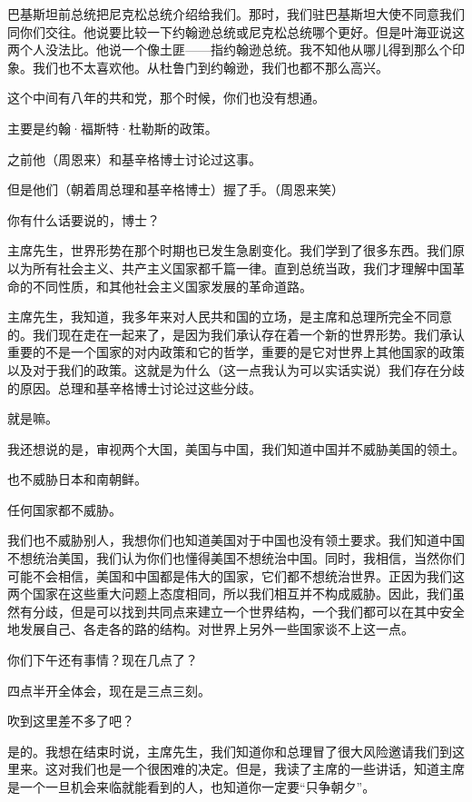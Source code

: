 巴基斯坦前总统把尼克松总统介绍给我们。那时，我们驻巴基斯坦大使不同意我们同你们交往。他说要比较一下约翰逊总统或尼克松总统哪个更好。但是叶海亚说这两个人没法比。他说一个像土匪——指约翰逊总统。我不知他从哪儿得到那么个印象。我们也不太喜欢他。从杜鲁门到约翰逊，我们也都不那么高兴。

这个中间有八年的共和党，那个时候，你们也没有想通。

主要是约翰·福斯特·杜勒斯的政策。

之前他（周恩来）和基辛格博士讨论过这事。

但是他们（朝着周总理和基辛格博士）握了手。（周恩来笑）

你有什么话要说的，博士？

主席先生，世界形势在那个时期也已发生急剧变化。我们学到了很多东西。我们原以为所有社会主义、共产主义国家都千篇一律。直到总统当政，我们才理解中国革命的不同性质，和其他社会主义国家发展的革命道路。

主席先生，我知道，我多年来对人民共和国的立场，是主席和总理所完全不同意的。我们现在走在一起来了，是因为我们承认存在着一个新的世界形势。我们承认重要的不是一个国家的对内政策和它的哲学，重要的是它对世界上其他国家的政策以及对于我们的政策。这就是为什么（这一点我认为可以实话实说）我们存在分歧的原因。总理和基辛格博士讨论过这些分歧。

就是嘛。

我还想说的是，审视两个大国，美国与中国，我们知道中国并不威胁美国的领土。

也不威胁日本和南朝鲜。

任何国家都不威胁。

我们也不威胁别人，我想你们也知道美国对于中国也没有领土要求。我们知道中国不想统治美国，我们认为你们也懂得美国不想统治中国。同时，我相信，当然你们可能不会相信，美国和中国都是伟大的国家，它们都不想统治世界。正因为我们这两个国家在这些重大问题上态度相同，所以我们相互并不构成威胁。因此，我们虽然有分歧，但是可以找到共同点来建立一个世界结构，一个我们都可以在其中安全地发展自己、各走各的路的结构。对世界上另外一些国家谈不上这一点。

你们下午还有事情？现在几点了？

四点半开全体会，现在是三点三刻。

吹到这里差不多了吧？

是的。我想在结束时说，主席先生，我们知道你和总理冒了很大风险邀请我们到这里来。这对我们也是一个很困难的决定。但是，我读了主席的一些讲话，知道主席是一个一旦机会来临就能看到的人，也知道你一定要“只争朝夕”。

